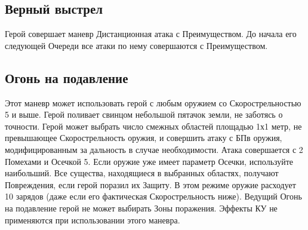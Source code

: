 \subsection{Верный выстрел}
Герой совершает маневр Дистанционная атака с Преимуществом. До начала его следующей Очереди все атаки по нему совершаются с Преимуществом.
\subsection{Огонь на подавление}
Этот маневр может использовать герой с любым оружием со Скорострельностью 5 и выше. Герой поливает свинцом небольшой пятачок земли, не заботясь о точности. Герой может выбрать число смежных областей площадью 1х1 метр, не превышающее Скорострельность оружия, и совершить атаку с БПв оружия, модифицированным за дальность в случае необходимости. Атака совершается с 2 Помехами и Осечкой 5. Если оружие уже имеет параметр Осечки, используйте наибольший. Все существа, находящиеся в выбранных областях, получают Повреждения, если герой поразил их Защиту. В этом режиме оружие расходует 10 зарядов (даже если его фактическая Скорострельность ниже). Ведущий Огонь на подавление герой не может выбирать Зоны поражения.
\newline
Эффекты КУ не применяются при использовании этого маневра.